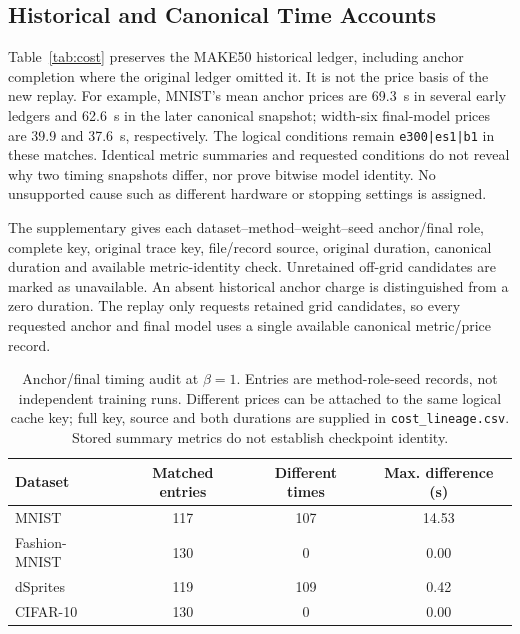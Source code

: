 \documentclass[make,article,submit,pdftex,moreauthors]{Definitions/mdpi}
\begin{document}
\subsection{Historical and Canonical Time Accounts}\label{app:timing}
Table~\ref{tab:cost} preserves the MAKE50 historical ledger, including
anchor completion where the original ledger omitted it. It is not the
price basis of the new replay. For example, MNIST's mean anchor prices
are 69.3~s in several early ledgers and 62.6~s in the later canonical
snapshot; width-six final-model prices are 39.9 and 37.6~s, respectively.
The logical conditions remain \texttt{e300|es1|b1} in these matches.
Identical metric summaries and requested conditions do not reveal why
two timing snapshots differ, nor prove bitwise model identity.
No unsupported cause such as different hardware or stopping settings
is assigned.

The supplementary  gives each
dataset--method--weight--seed anchor/final role, complete key, original
trace key, file/record source, original duration, canonical duration and
available metric-identity check. Unretained off-grid candidates are
marked as unavailable. An absent historical anchor charge is distinguished
from a zero duration. The replay only requests retained grid candidates,
so every requested anchor and final model uses a single available
canonical metric/price record.
\begin{table}[H]
\caption{Anchor/final timing audit at $\beta=1$. Entries are method-role-seed records, not independent training runs. Different prices can be attached to the same logical cache key; full key, source and both durations are supplied in \texttt{cost\_lineage.csv}. Stored summary metrics do not establish checkpoint identity.}\label{tab:timing_audit}
\small
\setlength{\tabcolsep}{3pt}
\begin{tabular*}{\textwidth}{@{\extracolsep{\fill}}lccc@{}}
\toprule
Dataset & Matched entries & Different times & Max. difference (s) \\
\midrule
MNIST & 117 & 107 & 14.53 \\
Fashion-MNIST & 130 & 0 & 0.00 \\
dSprites & 119 & 109 & 0.42 \\
CIFAR-10 & 130 & 0 & 0.00 \\
\bottomrule\end{tabular*}
\end{table}
\end{document}

